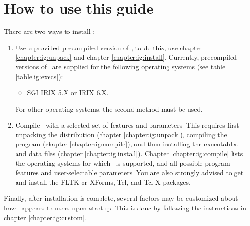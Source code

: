 \section{How to use this guide}
\label{section:ig:howtouse}

There are two ways to install \VMD:
\begin{enumerate}
  \item Use a provided precompiled version of \VMD; to do this, use
chapter \ref{chapter:ig:unpack} and chapter \ref{chapter:ig:install}. 
Currently, precompiled versions of \VMD\ are supplied for the following
operating systems (see table \ref{table:ig:execs}):
  \begin{itemize}
    \item SGI IRIX 5.X or IRIX 6.X.
  \end{itemize}
For other operating systems, the second method must be used. 
  \item Compile \VMD\ with a selected set of features and
parameters.  This requires first unpacking the distribution (chapter
\ref{chapter:ig:unpack}), compiling the program (chapter
\ref{chapter:ig:compile}), and then installing the executables and
data files (chapter \ref{chapter:ig:install}).  Chapter
\ref{chapter:ig:compile} lists the operating systems for which
\VMD\ is supported, and all possible program features and
user-selectable parameters.  You are also strongly advised to
get and install the FLTK or XForms, Tcl, and Tcl-X packages.
\end{enumerate}

Finally, after installation is complete, several factors may be customized
about how \VMD\ appears to users upon startup.
This is done by following the instructions in chapter \ref{chapter:ig:custom}.


\label{section:ig:moreinfo}


\label{section:ig:authors}


\label{section:ig:ref}

